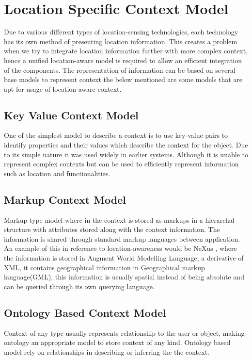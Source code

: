 \documentclass[12pt]{report}
\begin{document}
\section{Location Specific Context Model}

Due to various different types of location-sensing technologies, each technology has its own method of presenting location information. This creates a problem when we try to integrate location information further with more complex context, hence a unified location-aware model is required to allow an efficient integration of the components. The representation of information can be based on several base models to represent context the below mentioned are some models that are apt for usage of location-aware context.


\subsection{Key Value Context Model}
One of the simplest model to describe a context is to use key-value pairs to identify properties and their values which describe the context for the object. Due to its simple nature it was used widely in earlier systems. Although it is unable to represent complex contexts but can be used to efficiently represent information such as location and functionalities.

\subsection{Markup Context Model}
Markup type model where in the context is stored as markups in a hierarchal structure with attributes stored along with the context information. The information is shared through standard markup languages between application. An example of this in reference to location-awareness would be NeXus \cite{hohl1999next}, where the information is stored in Augment World Modelling Language, a derivative of XML, it contains geographical information in Geographical markup language(GML), this information is usually spatial instead of being absolute and can be queried through its own querying language. 


\subsection{Ontology Based Context Model}
Context of any type usually represents relationship to the user or object, making ontology an appropriate model to store context of any kind. Ontology based model rely on relationships in describing or inferring the the context.
\end{document}
